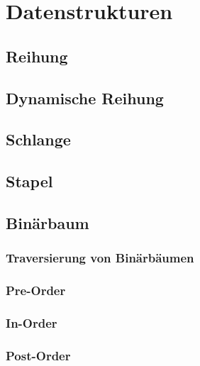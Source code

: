 \section{Datenstrukturen}
\subsection{Reihung}
\subsection{Dynamische Reihung}
\subsection{Schlange}
\subsection{Stapel}
\subsection{Binärbaum}
\subsubsection{Traversierung von Binärbäumen}
\subsubsection*{Pre-Order}
\subsubsection*{In-Order}
\subsubsection*{Post-Order}
